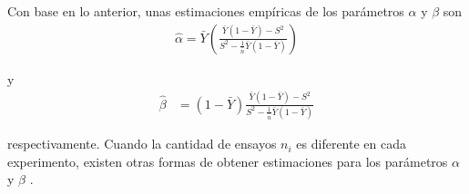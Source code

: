 Con base en lo anterior, unas estimaciones empíricas de los parámetros $\alpha$ y $\beta$ son
\begin{align}
\hat{\alpha}=\bar{Y}\left(\frac{\bar{Y}\left(1-\bar{Y}\right)
-S^2}{S^2-\frac{1}{\hat{n}}\bar{Y}\left(1-\bar{Y}\right)}\right)
\end{align}

y
\begin{align}
\hat{\beta}&=(1-\bar{Y})\frac{\bar{Y}\left(1-\bar{Y}\right)-S^2}{S^2-\frac{1}{\hat{n}}\bar{Y}\left(1-\bar{Y}\right)}
\end{align}

respectivamente. Cuando la cantidad de ensayos $n_i$ es diferente en cada experimento, existen otras formas de obtener estimaciones para los parámetros $\alpha$ y $\beta$ \cite[p. 81]{Carlin96}.

